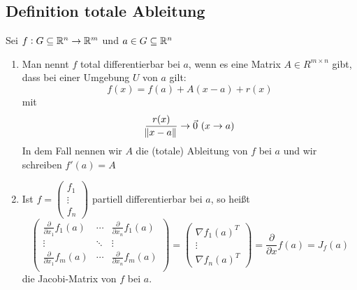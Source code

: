 \subsection{Definition totale Ableitung}
Sei $f: G \subseteq \mathbb{R}^n \rightarrow \mathbb{R}^m$ und $a \in G \subseteq \mathbb{R}^n$
\begin{enumerate}[label= (\alph*)]
    \item
        Man nennt $f$ total differentierbar bei $a$, wenn es eine Matrix $A \in
        R^{m \times n}$ gibt, dass bei einer Umgebung $U$ von $a$ gilt:
        \begin{equation*}
            f(x) = f(a) + A(x-a) + r(x)
        \end{equation*}
        mit
        \begin{equation*}
            \frac{r(x)}{\norm{x-a}} \rightarrow \vec{0}\ (x \rightarrow a)
        \end{equation*}
        In dem Fall nennen wir $A$ die (totale) Ableitung von $f$ bei $a$ und wir
        schreiben $f'(a) = A$
    \item Ist   $f = \begin{pmatrix}f_1\\ \vdots \\ f_n\end{pmatrix}$ partiell
        differentierbar bei $a$, so heißt
        \begin{equation*}
            \begin{pmatrix}
                \frac{\partial}{\partial x_1} f_1(a) & \cdots & \frac{\partial}{\partial x_n} f_1(a)\\
                \vdots & \ddots & \vdots \\
                \frac{\partial}{\partial x_1} f_m(a) & \cdots & \frac{\partial}{\partial x_n} f_m(a)\\
            \end{pmatrix}
            =
            \begin{pmatrix}
                \nabla {f_1(a)}^T \\ \vdots \\ \nabla {f_n(a)}^T
            \end{pmatrix}
            = \frac{\partial}{\partial x}f(a) = J_f(a)
        \end{equation*}
        die Jacobi-Matrix von $f$ bei $a$.
\end{enumerate}

